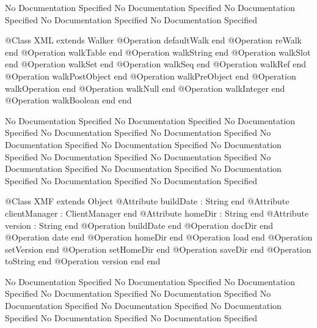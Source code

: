 No Documentation Specified
No Documentation Specified
No Documentation Specified
No Documentation Specified
No Documentation Specified
\begin{Interface}
@Class XML extends Walker
  @Operation defaultWalk end
  @Operation reWalk end
  @Operation walkTable end
  @Operation walkString end
  @Operation walkSlot end
  @Operation walkSet end
  @Operation walkSeq end
  @Operation walkRef end
  @Operation walkPostObject end
  @Operation walkPreObject end
  @Operation walkOperation end
  @Operation walkNull end
  @Operation walkInteger end
  @Operation walkBoolean end
end
\end{Interface}
No Documentation Specified
No Documentation Specified
No Documentation Specified
No Documentation Specified
No Documentation Specified
No Documentation Specified
No Documentation Specified
No Documentation Specified
No Documentation Specified
No Documentation Specified
No Documentation Specified
No Documentation Specified
No Documentation Specified
No Documentation Specified
No Documentation Specified
\begin{Interface}
@Class XMF extends Object
  @Attribute buildDate : String end
  @Attribute clientManager : ClientManager end
  @Attribute homeDir : String end
  @Attribute version : String end
  @Operation buildDate end
  @Operation docDir end
  @Operation date end
  @Operation homeDir end
  @Operation load end
  @Operation setVersion end
  @Operation setHomeDir end
  @Operation saveDir end
  @Operation toString end
  @Operation version end
end
\end{Interface}
No Documentation Specified
No Documentation Specified
No Documentation Specified
No Documentation Specified
No Documentation Specified
No Documentation Specified
No Documentation Specified
No Documentation Specified
No Documentation Specified
No Documentation Specified

